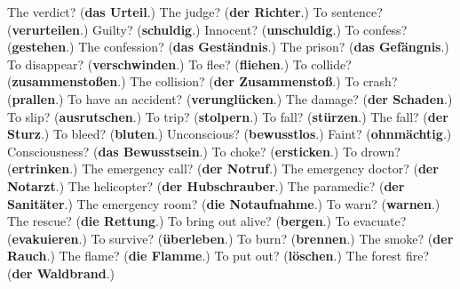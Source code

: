 \begin{tcolorbox}[breakable,colback=teal!4,colframe=teal!35!black,title={Before you move on}]
The verdict? (\textbf{das Urteil}.) The judge? (\textbf{der Richter}.) To sentence? (\textbf{verurteilen}.) Guilty? (\textbf{schuldig}.) Innocent? (\textbf{unschuldig}.) To confess? (\textbf{gestehen}.) The confession? (\textbf{das Geständnis}.) The prison? (\textbf{das Gefängnis}.) To disappear? (\textbf{verschwinden}.) To flee? (\textbf{fliehen}.) To collide? (\textbf{zusammenstoßen}.) The collision? (\textbf{der Zusammenstoß}.) To crash? (\textbf{prallen}.) To have an accident? (\textbf{verunglücken}.) The damage? (\textbf{der Schaden}.) To slip? (\textbf{ausrutschen}.) To trip? (\textbf{stolpern}.) To fall? (\textbf{stürzen}.) The fall? (\textbf{der Sturz}.) To bleed? (\textbf{bluten}.) Unconscious? (\textbf{bewusstlos}.) Faint? (\textbf{ohnmächtig}.) Consciousness? (\textbf{das Bewusstsein}.) To choke? (\textbf{ersticken}.) To drown? (\textbf{ertrinken}.) The emergency call? (\textbf{der Notruf}.) The emergency doctor? (\textbf{der Notarzt}.) The helicopter? (\textbf{der Hubschrauber}.) The paramedic? (\textbf{der Sanitäter}.) The emergency room? (\textbf{die Notaufnahme}.) To warn? (\textbf{warnen}.) The rescue? (\textbf{die Rettung}.) To bring out alive? (\textbf{bergen}.) To evacuate? (\textbf{evakuieren}.) To survive? (\textbf{überleben}.) To burn? (\textbf{brennen}.) The smoke? (\textbf{der Rauch}.) The flame? (\textbf{die Flamme}.) To put out? (\textbf{löschen}.) The forest fire? (\textbf{der Waldbrand}.)
\end{tcolorbox}
